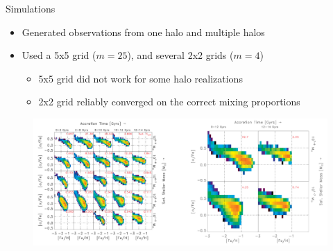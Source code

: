 \documentclass{beamer}
\begin{document}
\begin{frame}{Simulations}
	
	
	
	
	\begin{itemize}
		\item Generated observations from one halo and multiple halos
		
		\item Used a 5x5 grid ($m=25$), and several 2x2 grids ($m=4$)
		\begin{itemize}
			\item 5x5 grid did not work for some halo realizations
			\item 2x2 grid reliably converged on the correct mixing proportions
		\end{itemize}
	\end{itemize}
	
	
	
	\begin{figure}
			\begin{center}
				\includegraphics[width=\textwidth]{ourdens.pdf}
			\end{center}
	\end{figure}
	
	
	
	
\end{frame}
\end{document}
